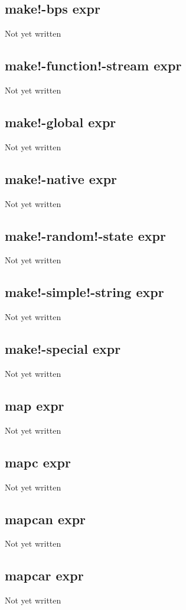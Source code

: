 \documentclass[a4paper,11pt]{article}
\begin{document}
{\subsection{\ttfamily make!-bps expr}
Not yet written

\subsection{\ttfamily make!-function!-stream expr}
Not yet written

\subsection{\ttfamily make!-global expr}
Not yet written

\subsection{\ttfamily make!-native expr}
Not yet written

\subsection{\ttfamily make!-random!-state expr}
Not yet written

\subsection{\ttfamily make!-simple!-string expr}
Not yet written

\subsection{\ttfamily make!-special expr}
Not yet written

\subsection{\ttfamily map expr}
Not yet written

\subsection{\ttfamily mapc expr}
Not yet written

\subsection{\ttfamily mapcan expr}
Not yet written

\subsection{\ttfamily mapcar expr}
Not yet written

}
\end{document}
